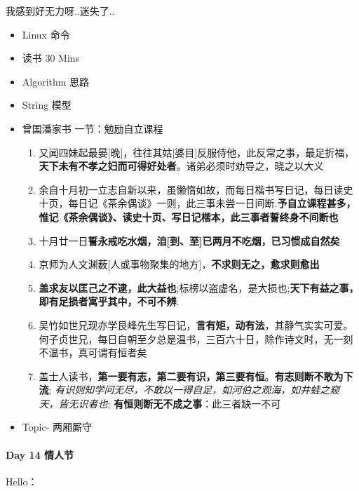 \documentclass[UTF8,a4paper,8pt]{ctexart}
\begin{document}
	 	 我感到好无力呀..迷失了..
	 	 \begin{itemize}
	 	 	\item  Linux 命令
	 	 	
	 	 	\item  \makebox[0pt][l]{$\square$}\raisebox{.15ex}{\hspace{0.1em}$\checkmark$} 读书  30 Mins		 	 
	 	 	\item  Algorithm 思路
	 	 	\item  \makebox[0pt][l]{$\square$}\raisebox{.15ex}{\hspace{0.1em}$\checkmark$} String 模型
	 	 	
	 	 	\item  曾国潘家书 一节：勉励自立课程
		 	 	\begin{enumerate}
		 	 		\item 又闻四妹起最晏[晚]，往往其姑[婆目]反服侍他，此反常之事，最足折福，\textbf{天下未有不孝之妇而可得好处者}。诸弟必须时劝导之，晓之以大义
		 	 		\item 余自十月初一立志自新以来，虽懒惰如故，而每日楷书写日记，每日读史十页，每日记《茶余偶谈》一则，此三事未尝一日间断.\textbf{予自立课程甚多，惟记《茶余偶谈》、读史十页、写日记楷本，此三事者誓终身不间断也}
		 	 		\item 十月廿一日\textbf{誓永戒吃水烟，洎[到、至]已两月不吃烟，已习惯成自然矣}
		 	 		\item 京师为人文渊薮[人或事物聚集的地方]，\textbf{不求则无之，愈求则愈出}
		 	 		\item \textbf{盖求友以匡己之不逮，此大益也};标榜以盗虚名，是大损也;\textbf{天下有益之事，即有足损者寓乎其中，不可不辨}.
		 	 		\item 吴竹如世兄现亦学艮峰先生写日记，\textbf{言有矩，动有法}，其静气实实可爱。何子贞世兄，每日自朝至夕总是温书，三百六十日，除作诗文时，无一刻不温书，真可谓有恒者矣
		 	 		\item 盖士人读书，\textbf{第一要有志，第二要有识，第三要有恒}。\textbf{有志则断不敢为下流}; \textit{有识则知学问无尽，不敢以一得自足，如河伯之观海，如井蛙之窥天，皆无识者也}; \textbf{有恒则断无不成之事}：此三者缺一不可
		 	 	\end{enumerate}
	 	 	\item  \makebox[0pt][l]{$\square$}\raisebox{.15ex}{\hspace{0.1em}$\checkmark$} Topic- 两厢厮守
	 	 \end{itemize}
 	 \paragraph{Day 14  情人节   \quad     }
	 	  Hello：
	 
\end{document}
